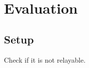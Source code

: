 \documentclass[sigconf,authordraft]{acmart}
\begin{document}







\section{Evaluation}
\subsection{Setup}


Check if it is not relayable.
\end{document}
